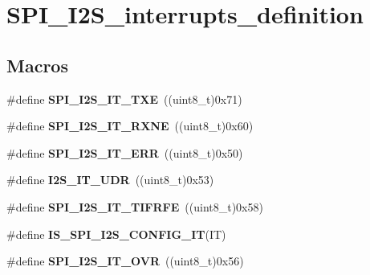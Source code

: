 \hypertarget{group___s_p_i___i2_s__interrupts__definition}{}\section{S\+P\+I\+\_\+\+I2\+S\+\_\+interrupts\+\_\+definition}
\label{group___s_p_i___i2_s__interrupts__definition}
\subsection*{Macros}
\begin{DoxyCompactItemize}
\item 
\hypertarget{group___s_p_i___i2_s__interrupts__definition_ga0f192977fdb12c40d35672b8ae074724}{}\#define {\bfseries S\+P\+I\+\_\+\+I2\+S\+\_\+\+I\+T\+\_\+\+T\+X\+E}~((uint8\+\_\+t)0x71)\label{group___s_p_i___i2_s__interrupts__definition_ga0f192977fdb12c40d35672b8ae074724}

\item 
\hypertarget{group___s_p_i___i2_s__interrupts__definition_gae46dd53cd2e4ad8b8a7836d3dcec57ea}{}\#define {\bfseries S\+P\+I\+\_\+\+I2\+S\+\_\+\+I\+T\+\_\+\+R\+X\+N\+E}~((uint8\+\_\+t)0x60)\label{group___s_p_i___i2_s__interrupts__definition_gae46dd53cd2e4ad8b8a7836d3dcec57ea}

\item 
\hypertarget{group___s_p_i___i2_s__interrupts__definition_ga1d9d4916bf7ae315f23a54ecfbcd9157}{}\#define {\bfseries S\+P\+I\+\_\+\+I2\+S\+\_\+\+I\+T\+\_\+\+E\+R\+R}~((uint8\+\_\+t)0x50)\label{group___s_p_i___i2_s__interrupts__definition_ga1d9d4916bf7ae315f23a54ecfbcd9157}

\item 
\hypertarget{group___s_p_i___i2_s__interrupts__definition_ga54aba7dc06f97fb4839de5f42bd5a47d}{}\#define {\bfseries I2\+S\+\_\+\+I\+T\+\_\+\+U\+D\+R}~((uint8\+\_\+t)0x53)\label{group___s_p_i___i2_s__interrupts__definition_ga54aba7dc06f97fb4839de5f42bd5a47d}

\item 
\hypertarget{group___s_p_i___i2_s__interrupts__definition_gab147fb8ba6913106e06ac80dcf4005a4}{}\#define {\bfseries S\+P\+I\+\_\+\+I2\+S\+\_\+\+I\+T\+\_\+\+T\+I\+F\+R\+F\+E}~((uint8\+\_\+t)0x58)\label{group___s_p_i___i2_s__interrupts__definition_gab147fb8ba6913106e06ac80dcf4005a4}

\item 
\#define {\bfseries I\+S\+\_\+\+S\+P\+I\+\_\+\+I2\+S\+\_\+\+C\+O\+N\+F\+I\+G\+\_\+\+I\+T}(I\+T)
\item 
\hypertarget{group___s_p_i___i2_s__interrupts__definition_ga279c30176e8ff7e2ec299774a2e88f45}{}\#define {\bfseries S\+P\+I\+\_\+\+I2\+S\+\_\+\+I\+T\+\_\+\+O\+V\+R}~((uint8\+\_\+t)0x56)\label{group___s_p_i___i2_s__interrupts__definition_ga279c30176e8ff7e2ec299774a2e88f45}


\end{DoxyCompactItemize}
